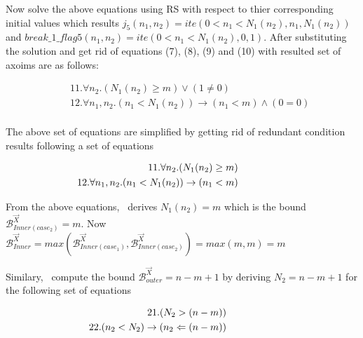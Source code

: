 Now solve the above equations using RS  with respect to thier corresponding initial values which results $j_5(n_1,n_2)=ite(0<n_1< N_1(n_2),n_1,N_1(n_2))$ and $break\_1\_flag5(n_1,n_2)=ite(0<n_1< N_1(n_2),0,1)$. After substituting the solution and get rid of equations (7), (8), (9) and (10) with resulted set of axoims are as follows:

\begin{eqnarray*}
	&&11.\forall n_2.(N_1(n_2)\geq m) \lor (1\not=0) \\
	&&12.\forall n_1,n_2.(n_1<N_1(n_2)) \rightarrow (n_1<m) \land (0=0)\\
\end{eqnarray*}

The above set of equations are simplified by getting rid of redundant condition results following a set of equations

\begin{eqnarray*}
	&&\hspace*{-6em}11.\forall n_2.(N_1(n_2)\geq m)  \\
	&&\hspace*{-6em}12.\forall n_1,n_2.(n_1<N_1(n_2)) \rightarrow (n_1<m)\\
\end{eqnarray*}

From the above equations, \SystemName\ derives $N_1(n_2)=m$ which is the bound $\mathcal{B}^{\vec{X}}_{Inner(case_2)}=m$. Now $\mathcal{B}^{\vec{X}}_{Inner}=max(\mathcal{B}^{\vec{X}}_{Inner(case_1)},\mathcal{B}^{\vec{X}}_{Inner(case_2)})=max(m,m)=m$





Similary, \SystemName\ compute the bound $\mathcal{B}^{\vec{X}}_{outer}=n-m+1$ by deriving $N_2=n-m+1$ for the following set of equations

\begin{eqnarray*}
	&&\hspace*{-6em}21.(N_2>(n-m)) \\
	&&\hspace*{-6em}22.(n_2<N_2) \rightarrow (n_2<=(n-m)) 
\end{eqnarray*}









